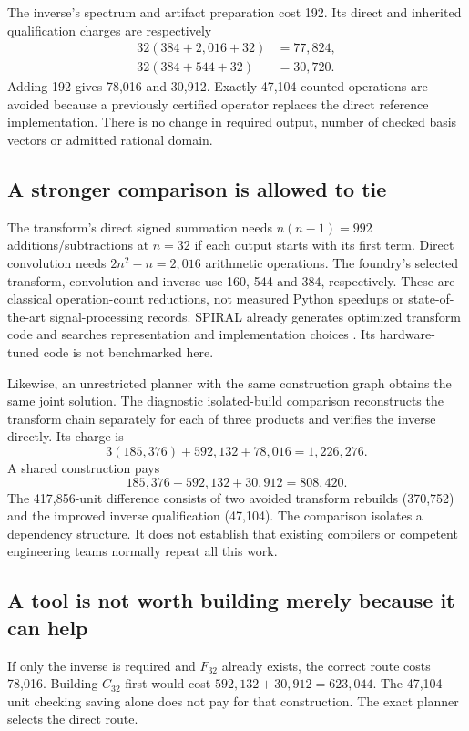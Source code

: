\documentclass[11pt,letterpaper]{article}
\theoremstyle{definition}\newtheorem{definition}[theorem]{Definition}
\theoremstyle{remark}\newtheorem{remark}[theorem]{Remark}
\begin{document}
The inverse's spectrum and artifact preparation cost 192. Its direct and inherited qualification charges are respectively
\begin{align}
 32(384+2{,}016+32)&=77{,}824,\\
 32(384+544+32)&=30{,}720.
\end{align}
Adding 192 gives 78,016 and 30,912. Exactly 47,104 counted operations are avoided because a previously certified operator replaces the direct reference implementation. There is no change in required output, number of checked basis vectors or admitted rational domain.

\subsection{A stronger comparison is allowed to tie}
The transform's direct signed summation needs $n(n-1)=992$ additions/subtractions at $n=32$ if each output starts with its first term. Direct convolution needs $2n^2-n=2,016$ arithmetic operations. The foundry's selected transform, convolution and inverse use 160, 544 and 384, respectively. These are classical operation-count reductions, not measured Python speedups or state-of-the-art signal-processing records. SPIRAL already generates optimized transform code and searches representation and implementation choices \cite{spiral}. Its hardware-tuned code is not benchmarked here.

Likewise, an unrestricted planner with the same construction graph obtains the same joint solution. The diagnostic isolated-build comparison reconstructs the transform chain separately for each of three products and verifies the inverse directly. Its charge is
\begin{equation}
 3(185{,}376)+592{,}132+78{,}016=1{,}226{,}276.
\end{equation}
A shared construction pays
\begin{equation}
 185{,}376+592{,}132+30{,}912=808{,}420.
\end{equation}
The 417,856-unit difference consists of two avoided transform rebuilds (370,752) and the improved inverse qualification (47,104). The comparison isolates a dependency structure. It does not establish that existing compilers or competent engineering teams normally repeat all this work.

\subsection{A tool is not worth building merely because it can help}
If only the inverse is required and $F_{32}$ already exists, the correct route costs 78,016. Building $C_{32}$ first would cost $592{,}132+30{,}912=623{,}044$. The 47,104-unit checking saving alone does not pay for that construction. The exact planner selects the direct route.
\end{document}
